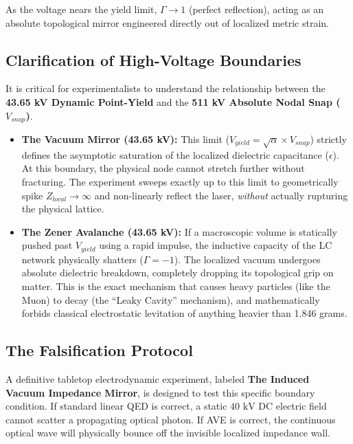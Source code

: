 As the voltage nears the yield limit, $\Gamma \to 1$ (perfect reflection), acting as an absolute topological mirror engineered directly out of localized metric strain.

\subsection{Clarification of High-Voltage Boundaries}
It is critical for experimentalists to understand the relationship between the \textbf{43.65 kV Dynamic Point-Yield} and the \textbf{511 kV Absolute Nodal Snap ($V_{snap}$)}.

\begin{itemize}
    \item \textbf{The Vacuum Mirror (43.65 kV):} This limit ($V_{yield} = \sqrt{\alpha} \times V_{snap}$) strictly defines the asymptotic saturation of the localized dielectric capacitance ($\epsilon$). At this boundary, the physical node cannot stretch further without fracturing. The experiment sweeps exactly up to this limit to geometrically spike $Z_{local} \to \infty$ and non-linearly reflect the laser, \textit{without} actually rupturing the physical lattice.
    \item \textbf{The Zener Avalanche (43.65 kV):} If a macroscopic volume is statically pushed past $V_{yield}$ using a rapid impulse, the inductive capacity of the LC network physically shatters ($\Gamma = -1$). The localized vacuum undergoes absolute dielectric breakdown, completely dropping its topological grip on matter. This is the exact mechanism that causes heavy particles (like the Muon) to decay (the ``Leaky Cavity'' mechanism), and mathematically forbids classical electrostatic levitation of anything heavier than 1.846 grams.
\end{itemize}

\subsection{The Falsification Protocol}
A definitive tabletop electrodynamic experiment, labeled \textbf{The Induced Vacuum Impedance Mirror}, is designed to test this specific boundary condition. If standard linear QED is correct, a static $40\text{ kV}$ DC electric field cannot scatter a propagating optical photon. If AVE is correct, the continuous optical wave will physically bounce off the invisible localized impedance wall.

